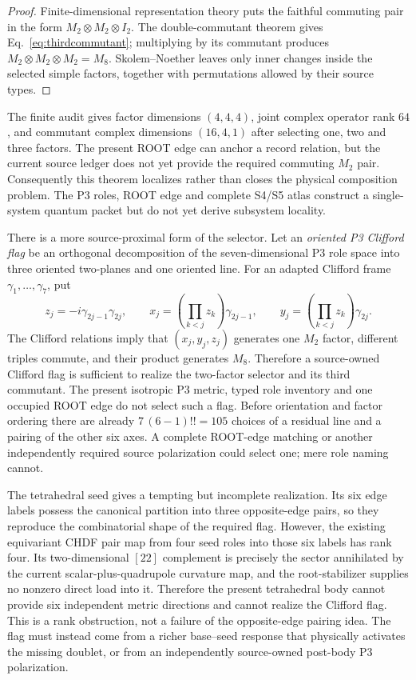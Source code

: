 \documentclass[11pt]{article}
\begin{document}
\begin{proof}
Finite-dimensional representation theory puts the faithful commuting pair in
the form $M_2\otimes M_2\otimes I_2$. The double-commutant theorem gives
Eq.~\eqref{eq:thirdcommutant}; multiplying by its commutant produces
$M_2\otimes M_2\otimes M_2=M_8$. Skolem--Noether leaves only inner changes
inside the selected simple factors, together with permutations allowed by
their source types.
\end{proof}

The finite audit gives factor dimensions $(4,4,4)$, joint complex operator rank
$64$, and commutant complex dimensions $(16,4,1)$ after selecting one, two
and three factors. The present ROOT edge can anchor a record relation, but
the current source ledger does not yet provide the required commuting
$M_2$ pair. Consequently this theorem localizes rather than closes the
physical composition problem. The P3 roles, ROOT edge and complete S4/S5
atlas construct a single-system quantum packet but do not yet derive
subsystem locality.

There is a more source-proximal form of the selector. Let an \emph{oriented
P3 Clifford flag} be an orthogonal decomposition of the seven-dimensional P3
role space into three oriented two-planes and one oriented line. For an
adapted Clifford frame $\gamma_1,\ldots,\gamma_7$, put
\begin{equation}
 z_j=-i\gamma_{2j-1}\gamma_{2j},\qquad
 x_j=\left(\prod_{k<j}z_k\right)\gamma_{2j-1},\qquad
 y_j=\left(\prod_{k<j}z_k\right)\gamma_{2j}.
 \label{eq:cliffordflag}
\end{equation}
The Clifford relations imply that $(x_j,y_j,z_j)$ generates one $M_2$
factor, different triples commute, and their product generates $M_8$.
Therefore a source-owned Clifford flag is sufficient to realize the
two-factor selector and its third commutant. The present isotropic P3 metric,
typed role inventory and one occupied ROOT edge do not select such a flag.
Before orientation and factor ordering there are already
$7\,(6-1)!!=105$ choices of a residual line and a pairing of the other six
axes. A complete ROOT-edge matching or another independently required source
polarization could select one; mere role naming cannot.

The tetrahedral seed gives a tempting but incomplete realization. Its six
edge labels possess the canonical partition into three opposite-edge pairs,
so they reproduce the combinatorial shape of the required flag. However, the
existing equivariant CHDF pair map from four seed roles into those six labels
has rank four. Its two-dimensional $[22]$ complement is precisely the sector
annihilated by the current scalar-plus-quadrupole curvature map, and the
root-stabilizer supplies no nonzero direct load into it. Therefore the present
tetrahedral body cannot provide six independent metric directions and cannot
realize the Clifford flag. This is a rank obstruction, not a failure of the
opposite-edge pairing idea. The flag must instead come from a richer
base--seed response that physically activates the missing doublet, or from an
independently source-owned post-body P3 polarization.
\end{document}
